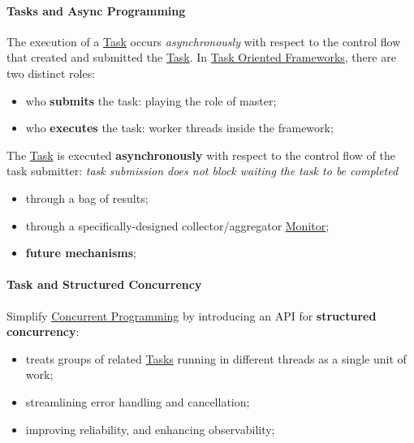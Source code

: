 \paragraph{Tasks and Async Programming}\label{par:ed_tasks_and_async_programming} %
The execution of a \hyperref[def:task]{Task} occurs \textit{asynchronously} with respect to the control flow that created and submitted the \hyperref[def:task]{Task}.
\emptyln{}
In \hyperref[par:ed_task_oriented_frameworks]{Task Oriented Frameworks}, there are two distinct roles:
\begin{itemize}
    \item who \textbf{submits} the task: playing the role of master;
    \item who \textbf{executes} the task: worker threads inside the framework;
\end{itemize}
\begin{note}
    The \hyperref[def:task]{Task} is executed \textbf{asynchronously} with respect to the control flow of the task submitter: \textit{task submission does not block waiting the task to be completed}
    \begin{warning}
        \begin{itemize}
            \item through a bag of results;
            \item through a specifically-designed collector/aggregator \hyperref[def:monitor]{Monitor};
            \item \textbf{future mechanisms};
        \end{itemize}
    \end{warning}
\end{note}
%
\paragraph{Task and Structured Concurrency}\label{par:ed_task_and_structured_concurrency} %
Simplify \hyperref[def:conc-prog]{Concurrent Programming} by introducing an API for \textbf{structured concurrency}:
\begin{itemize}
    \item treats groups of related \hyperref[def:task]{Tasks} running in different threads as a single unit of work;
    \item streamlining error handling and cancellation;
    \item improving reliability, and enhancing observability;
\end{itemize}
%

